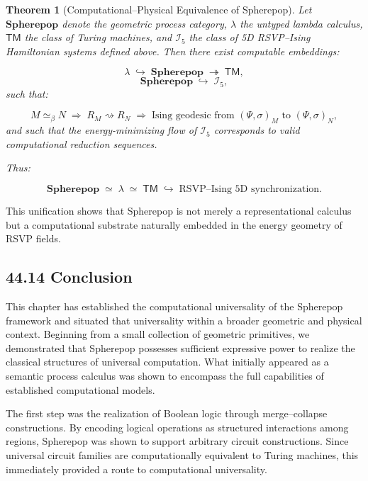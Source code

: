 \documentclass[12pt,letterpaper]{article}
\newtheorem{theorem}{Theorem}[section]
\theoremstyle{remark}
\begin{document}
\begin{theorem}[Computational–Physical Equivalence of Spherepop]
Let $\mathbf{Spherepop}$ denote the geometric process category,  
$\lambda$ the untyped lambda calculus,  
$\mathsf{TM}$ the class of Turing machines,  
and $\mathcal{I}_5$ the class of 5D RSVP–Ising Hamiltonian systems defined above.  
Then there exist computable embeddings:

\[
\lambda \;\hookrightarrow\; \mathbf{Spherepop} \;\twoheadrightarrow\; \mathsf{TM},
\]
\[
\mathbf{Spherepop} \;\hookrightarrow\; \mathcal{I}_5,
\]
such that:

\[
M \simeq_{\beta} N
\;\Longrightarrow\;
R_M \rightsquigarrow R_N
\;\Longrightarrow\;
\text{Ising geodesic from } (\Psi,\sigma)_M \text{ to } (\Psi,\sigma)_N,
\]
and such that the energy-minimizing flow of $\mathcal{I}_5$ corresponds to valid computational reduction sequences.

Thus:

\[
\boxed{
\mathbf{Spherepop} \;\simeq\; \lambda \;\simeq\; \mathsf{TM}
\;\hookrightarrow\;
\text{RSVP--Ising 5D synchronization}.
}
\]

\end{theorem}

This unification shows that Spherepop is not merely a representational calculus but a computational substrate naturally embedded in the energy geometry of RSVP fields.

\subsection{44.14 Conclusion}

This chapter has established the computational universality of the Spherepop framework and situated that universality within a broader geometric and physical context. Beginning from a small collection of geometric primitives, we demonstrated that Spherepop possesses sufficient expressive power to realize the classical structures of universal computation. What initially appeared as a semantic process calculus was shown to encompass the full capabilities of established computational models.

The first step was the realization of Boolean logic through merge--collapse constructions. By encoding logical operations as structured interactions among regions, Spherepop was shown to support arbitrary circuit constructions. Since universal circuit families are computationally equivalent to Turing machines, this immediately provided a route to computational universality.
\end{document}

